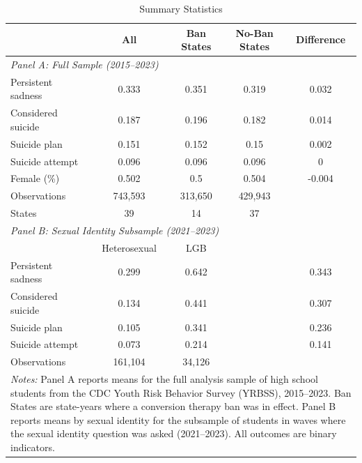 \begin{table}[t]
\centering
\caption{Summary Statistics}
\label{tab:summary}
\begin{tabular}{lcccc}
\hline\hline
 & \multicolumn{1}{c}{All} & \multicolumn{1}{c}{Ban States} & \multicolumn{1}{c}{No-Ban States} & \multicolumn{1}{c}{Difference} \\
\hline
\multicolumn{5}{l}{\textit{Panel A: Full Sample (2015--2023)}} \\[3pt]
Persistent sadness & 0.333 & 0.351 & 0.319 & 0.032 \\
Considered suicide & 0.187 & 0.196 & 0.182 & 0.014 \\
Suicide plan & 0.151 & 0.152 & 0.15 & 0.002 \\
Suicide attempt & 0.096 & 0.096 & 0.096 & 0 \\
Female (\%) & 0.502 & 0.5 & 0.504 & -0.004 \\
Observations & 743,593 & 313,650 & 429,943 & \\
States & 39 & 14 & 37 & \\[6pt]
\multicolumn{5}{l}{\textit{Panel B: Sexual Identity Subsample (2021--2023)}} \\[3pt]
 & \multicolumn{1}{c}{Heterosexual} & \multicolumn{1}{c}{LGB} & & \\
Persistent sadness & 0.299 & 0.642 & & 0.343 \\
Considered suicide & 0.134 & 0.441 & & 0.307 \\
Suicide plan & 0.105 & 0.341 & & 0.236 \\
Suicide attempt & 0.073 & 0.214 & & 0.141 \\
Observations & 161,104 & 34,126 & & \\
\hline\hline
\multicolumn{5}{p{0.95\textwidth}}{\footnotesize \textit{Notes:} Panel A reports means for the full analysis sample of high school students from the CDC Youth Risk Behavior Survey (YRBSS), 2015--2023. Ban States are state-years where a conversion therapy ban was in effect. Panel B reports means by sexual identity for the subsample of students in waves where the sexual identity question was asked (2021--2023). All outcomes are binary indicators.}
\end{tabular}
\end{table}
